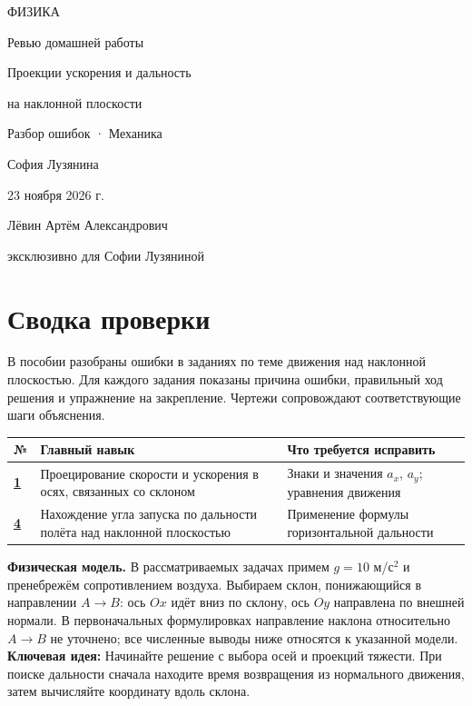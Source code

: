 \documentclass[a4paper,12pt]{article}
\newcommand{\idea}[1]{\textcolor{darkaccent}{\textbf{Ключевая идея:} #1}}
\begin{document}
\thispagestyle{empty}
\begin{center}
\vspace*{24mm}
{\large\color{darkaccent}ФИЗИКА}\par
\vspace{22mm}
{\LARGE Ревью домашней работы}\par
\vspace{12mm}
{\Large\color{accent}Проекции ускорения и дальность\par на наклонной плоскости}\par
\vspace{19mm}
{\normalsize Разбор ошибок · Механика}\par
\vfill
{\large София Лузянина}\par
\vspace{10mm}
{\normalsize 23 ноября 2026 г.}\par
\vspace{25mm}
{\small Лёвин Артём Александрович}\par
{\small эксклюзивно для Софии Лузяниной}\par
\vspace{14mm}
\end{center}
\clearpage
\section*{Сводка проверки}
В пособии разобраны ошибки в заданиях по теме движения над наклонной плоскостью. Для каждого задания показаны причина ошибки, правильный ход решения и упражнение на закрепление. Чертежи сопровождают соответствующие шаги объяснения.
\par\medskip\noindent\begin{tabularx}{\linewidth}{@{}p{17mm}X p{40mm}@{}}
\toprule
\textbf{№} & \textbf{Главный навык} & \textbf{Что требуется исправить}\\
\midrule
\hyperref[task:1]{\textbf{1}} & Проецирование скорости и ускорения в осях, связанных со склоном & Знаки и значения $a_x$, $a_y$; уравнения движения\\
\hyperref[task:4]{\textbf{4}} & Нахождение угла запуска по дальности полёта над наклонной плоскостью & Применение формулы горизонтальной дальности\\
\bottomrule
\end{tabularx}\par
\medskip\textbf{Физическая модель.} В рассматриваемых задачах примем $g=10$ м/с$^2$ и пренебрежём сопротивлением воздуха. Выбираем склон, понижающийся в направлении $A\to B$: ось $Ox$ идёт вниз по склону, ось $Oy$ направлена по внешней нормали. В первоначальных формулировках направление наклона относительно $A\to B$ не уточнено; все численные выводы ниже относятся к указанной модели.
\medskip\idea{Начинайте решение с выбора осей и проекций тяжести. При поиске дальности сначала находите время возвращения из нормального движения, затем вычисляйте координату вдоль склона.}
\end{document}
